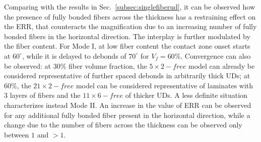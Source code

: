 \documentclass[review]{elsarticle}
\begin{document}
Comparing with the results in Sec.~\ref{subsec:singlefiberud}, it can be observed how the presence of fully bonded fibers across the thickness has a restraining effect on the ERR, that counteracts the magnification due to an increasing number of fully bonded fibers in the horizontal direction. The interplay is further modulated by the fiber content. For Mode I, at low fiber content the contact zone onset starts at $60^{\circ}$, while it is delayed to debonds of $70^{\circ}$ for $V_{f}=60\%$. Convergence can also be observed: at $30\%$ fiber volume fraction, the $5\times 2-free$ model can already be considered representative of further spaced debonds in arbitrarily thick UDs; at $60\%$, the $21\times 2-free$ model can be considered representative of laminates with 3 layers of fibers and the $11\times 6-free$ of thicker UDs. A less definite situation characterizes instead Mode II. An increase in the value of ERR can be observed for any additional fully bonded fiber present in the horizontal direction, while a change due to the number of fibers across the thickness can be observed only between $1$ and $>1$.
\end{document}
